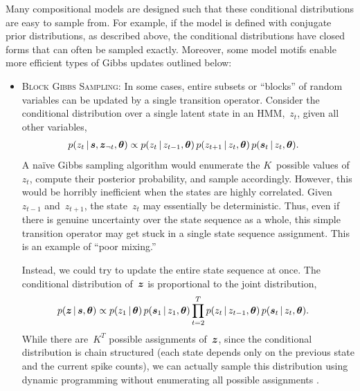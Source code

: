 Many compositional models are designed such that these conditional
distributions are easy to sample from. For example, if the
model is defined with conjugate prior distributions, as described
above, the conditional distributions have closed forms that can
often be sampled exactly. Moreover, some model motifs enable more
efficient types of Gibbs updates outlined below:

\begin{itemize}
\item \textsc{Block Gibbs Sampling}:
  In some cases, entire subsets or ``blocks'' of random variables can 
  be updated by a single transition operator. Consider the conditional
  distribution over a single latent state in an HMM,~$z_t$, given all other
  variables,  
  \begin{align*}
    p(z_t \,|\, \boldsymbol{s}, \boldsymbol{z}_{\neg t}, \boldsymbol{\theta}) 
    &\propto p(z_t \,|\, z_{t-1}, \boldsymbol{\theta}) \,
    p(z_{t+1} \,|\, z_t, \boldsymbol{\theta}) \,
    p(\boldsymbol{s}_t \,|\, z_t, \boldsymbol{\theta}).
  \end{align*}
  A na\"ive Gibbs sampling algorithm would enumerate the $K$~possible
  values of~$z_t$, compute their posterior probability, and sample
  accordingly. However, this would be horribly inefficient when the
  states are highly correlated. Given~$z_{t-1}$ and~$z_{t+1}$, the
  state~$z_t$ may essentially be deterministic. Thus, even if there is
  genuine uncertainty over the state sequence as a whole, this simple
  transition operator may get stuck in a single state sequence
  assignment.  This is an example of ``poor mixing.''

  Instead, we could try to update the entire state sequence at once. 
  The conditional distribution of~$\boldsymbol{z}$ is proportional to the joint 
  distribution,
  \begin{align*}
    p(\boldsymbol{z} \,|\, \boldsymbol{s}, \boldsymbol{\theta}) 
    &\propto p(z_1 \,|\, \boldsymbol{\theta}) \, p(\boldsymbol{s}_1 \,|\, z_1, \boldsymbol{\theta})
      \prod_{t=2}^T p(z_t \,|\, z_{t-1}, \boldsymbol{\theta}) \, 
      p(\boldsymbol{s}_t \,|\, z_t, \boldsymbol{\theta}).
  \end{align*}
  While there are~$K^T$ possible assignments of~$\boldsymbol{z}$, since the
  conditional distribution is chain structured (each state depends
  only on the previous state and the current spike counts), we can
  actually sample this distribution using dynamic programming
  without enumerating all possible assignments \citep[e.g.][]{bishop2006pattern}.
  

\end{itemize}
